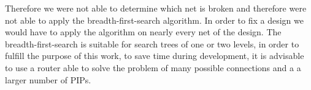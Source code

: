 Therefore we were not able to determine which net is broken and therefore were not able to apply the breadth-first-search algorithm. In order to fix a design we would have to apply the algorithm on nearly every net of the design.  The breadth-first-search is suitable for search trees of one or two levels, in order to fulfill the purpose of this work, to save time during development, it is advisable to use a router able to solve the problem of many possible connections and a a larger number of PIPs.




